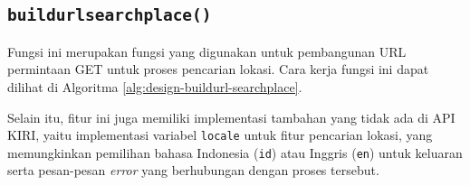 \subsection{\texttt{build\textunderscore url\textunderscore searchplace()}}
\label{sec:design-code-buildurl-searchplace}

Fungsi ini merupakan fungsi yang digunakan untuk pembangunan URL permintaan	GET untuk proses pencarian lokasi. Cara kerja fungsi ini dapat dilihat di Algoritma \ref{alg:design-buildurl-searchplace}.
	
	Selain itu, fitur ini juga memiliki implementasi tambahan yang tidak ada di API KIRI, yaitu implementasi variabel \verb|locale| untuk fitur pencarian lokasi, yang memungkinkan pemilihan bahasa Indonesia (\verb|id|) atau Inggris (\verb|en|) untuk keluaran serta pesan-pesan \textit{error} yang berhubungan dengan proses tersebut.

\begin{comment}
\begin{table}[H]
    \centering
    \caption{Detail dari fungsi \texttt{build\char`_url\char`_searchplace()}.}
    \begin{tabular}{| l | c p{10cm} |}
	\hline
		\textbf{Nama fungsi} & \multicolumn{2}{p{10.5cm} |}{\texttt{build\char`_url\char`_searchplace()}} \\
	\hline
		\textbf{Tujuan} & \multicolumn{2}{p{10.5cm} |}{Membangun URL untuk permintaan GET pencarian lokasi ke API KIRI.} \\
	\hline
		\textbf{\textit{Input}} & - & \texttt{locale}: Kode bahasa \\
		 & - & \texttt{region}: Region dari lokasi yang ingin dicari \\
		 & - & \texttt{query}: Kata kunci pencarian lokasi \\
		 & - & \texttt{error} (variabel global) \\
	\hline
		\textbf{\textit{Output}} & \multicolumn{2}{p{10.5cm} |}{\texttt{url} (variabel global)} \\
	\hline
		\textbf{\textit{Pseudocode}} & \multicolumn{2}{p{10.5cm} |}{Lihat di Algoritma \ref{alg:design-buildurl-searchplace}.} \\
	\hline
	\end{tabular}
    \label{tab:design-code-buildurl-searchplace-details}
\end{table}
\end{comment}

